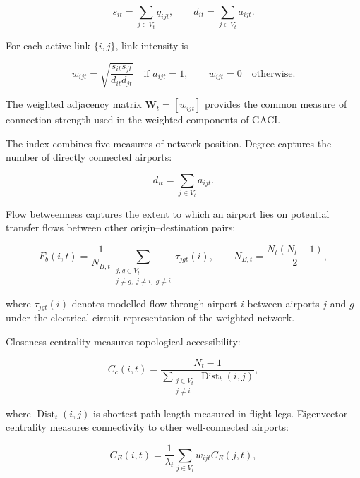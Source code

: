 \documentclass[12pt]{article}
\begin{document}
\begin{equation}
s_{it}=\sum_{j\in V_t}q_{ijt},
\qquad
d_{it}=\sum_{j\in V_t}a_{ijt}.
\label{eq:nature_12}
\end{equation}

For each active link $\{i,j\}$, link intensity is

\begin{equation}
w_{ijt}
=
\sqrt{
\frac{s_{it}s_{jt}}
{d_{it}d_{jt}}
}
\quad \text{if } a_{ijt}=1,
\qquad
w_{ijt}=0
\quad \text{otherwise}.
\label{eq:nature_13}
\end{equation}

The weighted adjacency matrix $\mathbf W_t=[w_{ijt}]$ provides the common measure of connection strength used in the weighted components of GACI.

The index combines five measures of network position. Degree captures the number of directly connected airports:

\begin{equation}
d_{it}=\sum_{j\in V_t}a_{ijt}.
\label{eq:nature_14}
\end{equation}

Flow betweenness captures the extent to which an airport lies on potential transfer flows between other origin--destination pairs:

\begin{equation}
F_b(i,t)
=
\frac{1}{N_{B,t}}
\sum_{\substack{j,g\in V_t\\j\neq g,\;j\neq i,\;g\neq i}}
\tau_{jgt}(i),
\qquad
N_{B,t}=\frac{N_t(N_t-1)}{2},
\label{eq:nature_15}
\end{equation}

where $\tau_{jgt}(i)$ denotes modelled flow through airport $i$ between airports $j$ and $g$ under the electrical-circuit representation of the weighted network.

Closeness centrality measures topological accessibility:

\begin{equation}
C_c(i,t)
=
\frac{N_t-1}
{\displaystyle
\sum_{\substack{j\in V_t\\j\neq i}}
\operatorname{Dist}_t(i,j)
},
\label{eq:nature_16}
\end{equation}

where $\operatorname{Dist}_t(i,j)$ is shortest-path length measured in flight legs. Eigenvector centrality measures connectivity to other well-connected airports:

\begin{equation}
C_E(i,t)
=
\frac{1}{\lambda_t}
\sum_{j\in V_t}
w_{ijt}C_E(j,t),
\label{eq:nature_17}
\end{equation}
\end{document}
